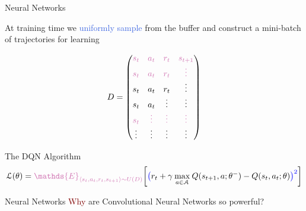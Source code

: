 \documentclass{beamer}
\begin{document}
\begin{frame}{Neural Networks}

	At training time we \textcolor{RoyalBlue}{uniformly sample} from the buffer and construct a \textcolor{skymagenta}{mini-batch} of trajectories for learning
	
	\begin{equation*}
		D = 
		\begin{pmatrix}
			\textcolor{skymagenta}{s_t} & \textcolor{skymagenta}{a_t} & \textcolor{skymagenta}{r_t} & \textcolor{skymagenta}{s_{t+1}} \\
			\textcolor{skymagenta}{s_t} & \textcolor{skymagenta}{a_t} & \textcolor{skymagenta}{r_t} & \textcolor{skymagenta}{\vdots} \\
			s_t & a_t & r_t & \vdots \\
			s_t & a_t & \vdots & \vdots \\
			\textcolor{skymagenta}{s_t} & \textcolor{skymagenta}{\vdots} & \textcolor{skymagenta}{\vdots} & \textcolor{skymagenta}{\vdots} \\
			\vdots & \vdots & \vdots & \vdots \\
		\end{pmatrix}
	\end{equation*}

	\begin{block}{The DQN Algorithm}
		\begin{multline*}
			\mathcal{L}(\theta) = \textcolor{skymagenta}{\mathds{E}_{\langle s_{t},a_{t},r_{t},s_{t+1}\rangle\sim U(D)}} \bigg[\textcolor{blue}{\big(}r_{t} + \gamma \: \underset{a\in \mathcal{A}}{\max}\: Q(s_{t+1}, a; \theta^{-}) - Q(s_{t}, a_{t}; \theta) \textcolor{blue}{\big)^{2}}\bigg]
		\end{multline*}
	\end{block}

\end{frame}




\begin{frame}{Neural Networks}
	\textcolor{Maroon}{Why} are Convolutional Neural Networks so powerful?
\end{frame}

\end{document}
